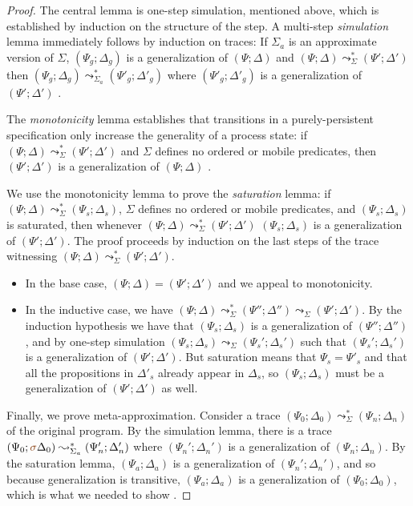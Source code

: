 \begin{proof}
  The central lemma is one-step simulation, mentioned above, which is
  established by induction on the structure of the step. A multi-step
  {\it simulation} lemma immediately follows by induction on
  traces: If $\Sigma_a$ is an approximate version of $\Sigma$,
  $(\Psi_g; \Delta_g)$ is a generalization of $(\Psi; \Delta)$ and
  $(\Psi; \Delta) \leadsto^*_\Sigma (\Psi'; \Delta')$ then $(\Psi_g;
  \Delta_g) \leadsto^*_{\Sigma_a} (\Psi'_g; \Delta'_g)$ where
  $(\Psi'_g; \Delta'_g)$ is a generalization of $(\Psi'; \Delta')$
  \cite[Lemma 7]{simmons11logical}.

  The {\it monotonicity} lemma establishes that transitions in a
  purely-persistent specification only increase the generality of a
  process state: if $(\Psi; \Delta) \leadsto^*_\Sigma (\Psi';
  \Delta')$ and $\Sigma$ defines no ordered or mobile predicates, then
  $(\Psi'; \Delta')$ is a generalization of $(\Psi; \Delta)$
  \cite[Lemma 8]{simmons11logical}.

  We use the monotonicity lemma to prove the {\it saturation} lemma:
  if $(\Psi; \Delta) \leadsto^*_\Sigma (\Psi_s; \Delta_s)$, $\Sigma$
  defines no ordered or mobile predicates, and $(\Psi_s; \Delta_s)$
  is saturated,
  then whenever $(\Psi; \Delta) \leadsto^*_\Sigma (\Psi'; \Delta')$
  $(\Psi_s; \Delta_s)$ is a generalization of $(\Psi'; \Delta')$. The
  proof proceeds by induction on the last steps of the trace
  witnessing $(\Psi; \Delta) \leadsto^*_\Sigma (\Psi'; \Delta')$.
  \begin{itemize}
  \item In the base case, $(\Psi; \Delta) = (\Psi'; \Delta')$ and we
    appeal to monotonicity.

  \item In the inductive case, we have $(\Psi; \Delta)
    \leadsto^*_\Sigma (\Psi''; \Delta'') \leadsto_\Sigma (\Psi';
    \Delta')$.  By the induction hypothesis we have that $(\Psi_s;
    \Delta_s)$ is a generalization of $(\Psi''; \Delta'')$, and by
    one-step simulation $(\Psi_s; \Delta_s) \leadsto_\Sigma (\Psi_s';
    \Delta_s')$ such that $(\Psi_s'; \Delta_s')$ is a generalization
    of $(\Psi'; \Delta')$. But saturation means that $\Psi_s =
    \Psi'_s$ and that all the propositions in $\Delta'_s$ already
    appear in $\Delta_s$, so $(\Psi_s; \Delta_s)$ must be a
    generalization of $(\Psi'; \Delta')$ as well. \cite[Lemma
    9]{simmons11logical}
  \end{itemize}

  Finally, we prove meta-approximation. Consider a trace $(\Psi_0;
  \Delta_0) \leadsto^*_\Sigma (\Psi_n; \Delta_n)$ of the original
  program. By the simulation lemma, there is a trace $(\Psi_0;
  {\lf\sigma}\Delta_0) \leadsto^*_{\Sigma_a} (\Psi_n'; \Delta_n')$ where
  $(\Psi_n'; \Delta_n')$ is a generalization of $(\Psi_n; \Delta_n)$.
  By the saturation lemma, $(\Psi_a; \Delta_a)$ is a generalization of
  $(\Psi_n'; \Delta_n')$, and so because generalization is transitive,
  $(\Psi_a; \Delta_a)$ is a generalization of $(\Psi_0; \Delta_0)$,
  which is what we needed to show \cite[Theorem 3]{simmons11logical}.
\end{proof}

